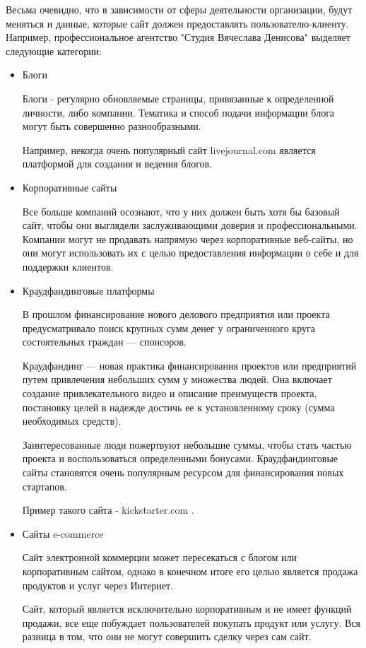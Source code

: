 Весьма очевидно, что в зависимости от сферы деятельности организации, будут меняться и данные, которые сайт должен предоставлять пользователю-клиенту.
Например, профессиональное агентство "Студия Вячеслава Денисова" \cite{denisov} выделяет следующие категории:
\begin{itemize}
	\item Блоги
    
    Блоги - регулярно обновляемые страницы, привязанные к определенной личности, либо компании.
	Тематика и способ подачи информации блога могут быть совершенно разнообразными.

	Например, некогда очень популярный сайт livejournal.com \cite{livejournal} является платформой для создания и ведения блогов.
    
	\item Корпоративные сайты

	Все больше компаний осознают, что у них должен быть хотя бы базовый сайт, чтобы они выглядели заслуживающими доверия и профессиональными. Компании могут не продавать напрямую через корпоративные веб-сайты, но они могут использовать их с целью предоставления информации о себе и для поддержки клиентов.

	\item Краудфандинговые платформы

	В прошлом финансирование нового делового предприятия или проекта предусматривало поиск крупных сумм денег у ограниченного круга состоятельных граждан — спонсоров.

	Краудфандинг — новая практика финансирования проектов или предприятий путем привлечения небольших сумм у множества людей. Она включает создание привлекательного видео и описание преимуществ проекта, постановку целей в надежде достичь ее к установленному сроку (сумма необходимых средств).

	Заинтересованные люди пожертвуют небольшие суммы, чтобы стать частью проекта и воспользоваться определенными бонусами. Краудфандинговые сайты становятся очень популярным ресурсом для финансирования новых стартапов.

    Пример такого сайта - kickstarter.com \cite{kickstarter}.

	\item Сайты e-commerce

	Сайт электронной коммерции может пересекаться с блогом или корпоративным сайтом, однако в конечном итоге его целью является продажа продуктов и услуг через Интернет.

	Сайт, который является исключительно корпоративным и не имеет функций продажи, все еще побуждает пользователей покупать продукт или услугу. Вся разница в том, что они не могут совершить сделку через сам сайт.


\end{itemize}
